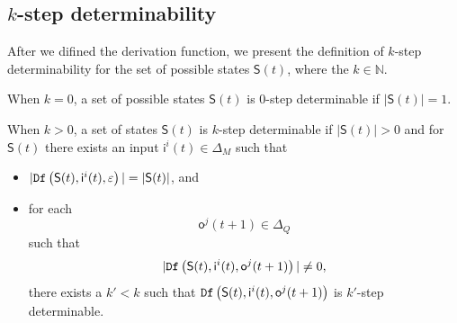\subsection{$k$-step determinability}
After we difined the derivation function, we present the definition of $k$-step determinability for the set of possible states $\mathsf{S}(t)$, where the $k\in \mathbb{N}$. %
\begin{definition} 

When $k=0$, a set of possible states $\mathsf{S}(t)$ is $0$-step determinable if $|\mathsf{S}(t)|=1$. 

When $k>0$, a set of states $\mathsf{S}(t)$ is $k$-step determinable
 if $|\mathsf{S}(t)|>0$ and for $\mathsf{S}(t)$ there exists an input $\mathsf{i}^{i}(t) \in \Delta_M$ such that
 \begin{itemize}
 \item  $|{\tt Df}\left(\mathsf{S}(t),\mathsf{i}^{i}(t),\varepsilon\right)|=|\mathsf{S}(t)|$, and 
 \item  for each \[\mathsf{o}^{j}(t+1)\in \Delta_Q\] such that \[|{\tt Df}\left(\mathsf{S}(t),\mathsf{i}^{i}(t),\mathsf{o}^{j}(t+1)\right)|\neq 0,\] there exists a ${k'}<k$ such that ${\tt Df}\left(\mathsf{S}(t),\mathsf{i}^{i}(t),\mathsf{o}^{j}(t+1)\right)$ is $k'$-step determinable.
 \end{itemize}
\end{definition}

